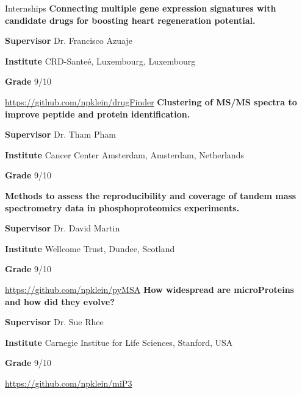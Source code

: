 \begin{rubric}{Internships}
%
%
%
	\textbf{Connecting multiple gene expression signatures with candidate drugs for boosting heart regeneration potential.} \par
	\textbf{Supervisor} Dr. Francisco Azuaje \par
	\textbf{Institute} CRD-Sante\'e, Luxembourg, Luxembourg \par
	\textbf{Grade} 9/10 \par
	\url{https://github.com/npklein/drugFinder}
%
%
\textbf{Clustering of MS/MS spectra to improve peptide and protein identification.} \par
\textbf{Supervisor} Dr. Tham Pham \par
\textbf{Institute} Cancer Center Amsterdam, Amsterdam, Netherlands\par
\textbf{Grade} 9/10 \par
%
\textbf{Methods to assess the reproducibility and coverage of tandem mass spectrometry data in phosphoproteomics experiments.} \par
\textbf{Supervisor} Dr. David Martin \par
\textbf{Institute} Wellcome Trust, Dundee, Scotland \par
\textbf{Grade} 9/10 \par
\url{https://github.com/npklein/pyMSA}
%
%
\textbf{How widespread are microProteins and how did they evolve?} \par
\textbf{Supervisor} Dr. Sue Rhee \par
\textbf{Institute} Carnegie Institue for Life Sciences, Stanford, USA \par
\textbf{Grade} 9/10 \par
\url{https://github.com/npklein/miP3}
%
\end{rubric}